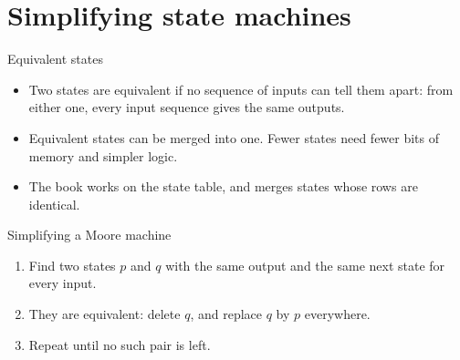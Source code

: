 \documentclass[10pt]{wosm-slides}
\begin{document}
\section{Simplifying state machines}

\begin{frame}{Equivalent states}
  \begin{itemize}
    \item Two states are \alert{equivalent} if no sequence of inputs can tell them
      apart: from either one, every input sequence gives the same outputs.
    \item Equivalent states can be merged into one. Fewer states need fewer bits of
      memory and simpler logic.
    \item The book works on the state table, and merges states whose rows are
      identical.
  \end{itemize}

  \bigskip
  \begin{block}{Simplifying a Moore machine}
    \begin{enumerate}
      \item Find two states $p$ and $q$ with the same output and the same next state
        for every input.
      \item They are equivalent: delete $q$, and replace $q$ by $p$ everywhere.
      \item Repeat until no such pair is left.
    \end{enumerate}
  \end{block}
\end{frame}
\end{document}
